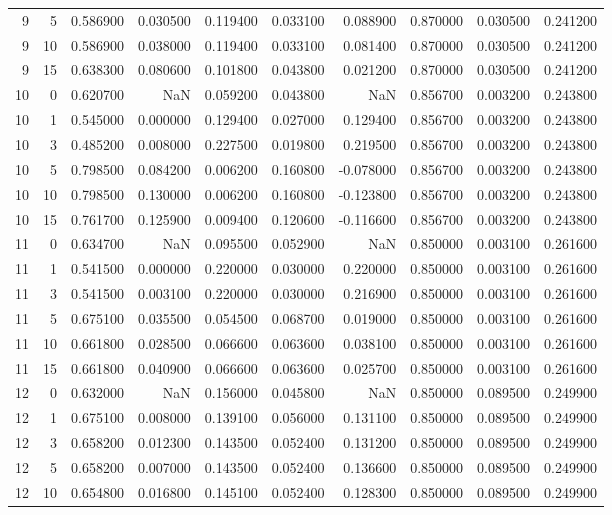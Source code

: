 \begin{table}
\begin{tabular}{rrrrrrrrrr}
9 & 5 & 0.586900 & 0.030500 & 0.119400 & 0.033100 & 0.088900 & 0.870000 & 0.030500 & 0.241200 \\
9 & 10 & 0.586900 & 0.038000 & 0.119400 & 0.033100 & 0.081400 & 0.870000 & 0.030500 & 0.241200 \\
9 & 15 & 0.638300 & 0.080600 & 0.101800 & 0.043800 & 0.021200 & 0.870000 & 0.030500 & 0.241200 \\
10 & 0 & 0.620700 & NaN & 0.059200 & 0.043800 & NaN & 0.856700 & 0.003200 & 0.243800 \\
10 & 1 & 0.545000 & 0.000000 & 0.129400 & 0.027000 & 0.129400 & 0.856700 & 0.003200 & 0.243800 \\
10 & 3 & 0.485200 & 0.008000 & 0.227500 & 0.019800 & 0.219500 & 0.856700 & 0.003200 & 0.243800 \\
10 & 5 & 0.798500 & 0.084200 & 0.006200 & 0.160800 & -0.078000 & 0.856700 & 0.003200 & 0.243800 \\
10 & 10 & 0.798500 & 0.130000 & 0.006200 & 0.160800 & -0.123800 & 0.856700 & 0.003200 & 0.243800 \\
10 & 15 & 0.761700 & 0.125900 & 0.009400 & 0.120600 & -0.116600 & 0.856700 & 0.003200 & 0.243800 \\
11 & 0 & 0.634700 & NaN & 0.095500 & 0.052900 & NaN & 0.850000 & 0.003100 & 0.261600 \\
11 & 1 & 0.541500 & 0.000000 & 0.220000 & 0.030000 & 0.220000 & 0.850000 & 0.003100 & 0.261600 \\
11 & 3 & 0.541500 & 0.003100 & 0.220000 & 0.030000 & 0.216900 & 0.850000 & 0.003100 & 0.261600 \\
11 & 5 & 0.675100 & 0.035500 & 0.054500 & 0.068700 & 0.019000 & 0.850000 & 0.003100 & 0.261600 \\
11 & 10 & 0.661800 & 0.028500 & 0.066600 & 0.063600 & 0.038100 & 0.850000 & 0.003100 & 0.261600 \\
11 & 15 & 0.661800 & 0.040900 & 0.066600 & 0.063600 & 0.025700 & 0.850000 & 0.003100 & 0.261600 \\
12 & 0 & 0.632000 & NaN & 0.156000 & 0.045800 & NaN & 0.850000 & 0.089500 & 0.249900 \\
12 & 1 & 0.675100 & 0.008000 & 0.139100 & 0.056000 & 0.131100 & 0.850000 & 0.089500 & 0.249900 \\
12 & 3 & 0.658200 & 0.012300 & 0.143500 & 0.052400 & 0.131200 & 0.850000 & 0.089500 & 0.249900 \\
12 & 5 & 0.658200 & 0.007000 & 0.143500 & 0.052400 & 0.136600 & 0.850000 & 0.089500 & 0.249900 \\
12 & 10 & 0.654800 & 0.016800 & 0.145100 & 0.052400 & 0.128300 & 0.850000 & 0.089500 & 0.249900 \\

\end{tabular}
\end{table}
